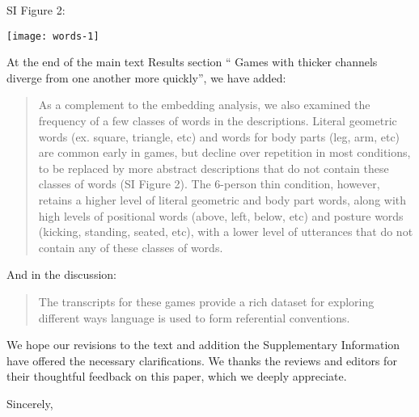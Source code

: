 \documentclass{stanfordletter}
\newcommand{\revised}[1]{\begin{quote}	#1 \end{quote}}
\begin{document}
\begin{letter}{}
          	SI Figure 2:
          	
          	{\begin{center} \texttt{[image: words-1]}\end{center}}
          
          At the end of the main text Results section `` Games with thicker channels diverge from one another more quickly'', we have added:
          
          \revised{As a complement to the embedding analysis, we also examined the frequency of a few classes of words in the descriptions. Literal geometric words (ex. square, triangle, etc) and words for body parts (leg, arm, etc) are common early in games, but decline over repetition in most conditions, to be replaced by more abstract descriptions that do not contain these classes of words (SI Figure 2). The 6-person thin condition, however, retains a higher level of literal geometric and body part words, along with high levels of positional words (above, left, below, etc) and posture words (kicking, standing, seated, etc), with a lower level of utterances that do not contain any of these classes of words.
          }
          
          And in the discussion:
          \revised{The transcripts for these games provide a rich dataset for exploring different ways language is used to form referential conventions. }
          
 We hope our revisions to the text and addition the Supplementary Information have offered the necessary clarifications. We thanks the reviews and editors for their thoughtful feedback on this paper, which we deeply appreciate. 
          
          



          
          \closing{Sincerely,}
	\end{letter}
	
\end{document}
